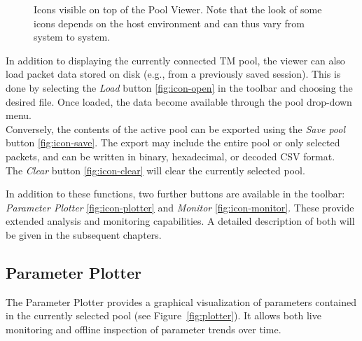 \begin{figure}[ht]
  \centering
  \caption{Icons visible on top of the Pool Viewer. Note that the look of some icons depends on the host environment and can thus vary from system to system.}
  \label{fig:pool-icons}
\end{figure}
\endgroup



In addition to displaying the currently connected TM pool, the viewer can also load packet data stored on disk (e.g., from a previously saved session). 
This is done by selecting the \emph{Load} button \ref{fig:icon-open} in the toolbar and choosing the desired file. 
Once loaded, the data become available through the pool drop-down menu.\\

Conversely, the contents of the active pool can be exported using the \emph{Save pool} button \ref{fig:icon-save}. 
The export may include the entire pool or only selected packets, and can be written in binary, hexadecimal, or decoded CSV format.\\

The \emph{Clear} button \ref{fig:icon-clear} will clear the currently selected pool.

In addition to these functions, two further buttons are available in the toolbar: \emph{Parameter Plotter} \ref{fig:icon-plotter} and \emph{Monitor} \ref{fig:icon-monitor}. 
These provide extended analysis and monitoring capabilities. A detailed description of both will be given in the subsequent chapters.










\subsection{Parameter Plotter}

The Parameter Plotter provides a graphical visualization of parameters contained in the currently selected pool (see Figure~\ref{fig:plotter}). 
It allows both live monitoring and offline inspection of parameter trends over time. \\

